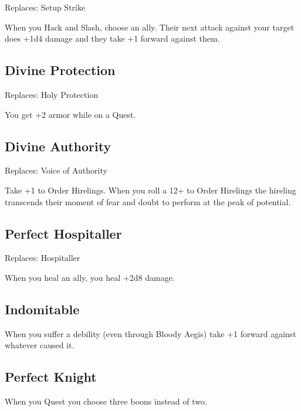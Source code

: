 Replaces: Setup Strike

         

When you Hack and Slash, choose an ally. Their next attack against your target does +1d4 damage and they take +1 forward against them.

         
\subsection{Divine Protection}    
         

Replaces: Holy Protection

         

You get +2 armor while on a Quest.

         
\subsection{Divine Authority}    
         

Replaces: Voice of Authority

         

Take +1 to Order Hirelings. When you roll a 12+ to Order Hirelings the hireling transcends their moment of fear and doubt to perform at the peak of potential.

         
\subsection{Perfect Hospitaller}    
         

Replaces: Hospitaller

         

When you heal an ally, you heal +2d8 damage.

         
\subsection{Indomitable}   
         

When you suffer a debility (even through Bloody Aegis) take +1 forward against whatever caused it.

         
\subsection{Perfect Knight}    
         

When you Quest you choose three boons instead of two.

       

                
